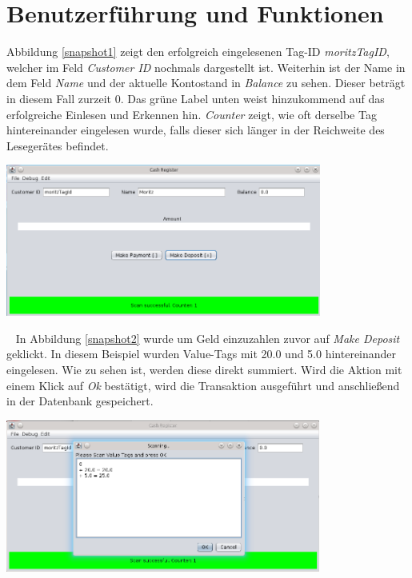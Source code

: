 \documentclass[11pt]{article} %
\begin{document}
\section{Benutzerführung und Funktionen}
Abbildung \ref{snapshot1} zeigt den erfolgreich eingelesenen Tag-ID
\textit{moritzTagID}, welcher im Feld \textit{Customer ID} nochmals
dargestellt ist. Weiterhin ist der Name in dem Feld \textit{Name} und der
aktuelle Kontostand in \textit{Balance} zu sehen. Dieser beträgt in diesem Fall
zurzeit 0. Das grüne Label unten weist hinzukommend auf das erfolgreiche
Einlesen und Erkennen hin. \textit{Counter} zeigt, wie oft derselbe Tag hintereinander
eingelesen wurde, falls dieser sich länger in der Reichweite des Lesegerätes
befindet.
\begin{center}
\includegraphics[height=5cm,keepaspectratio]{snapshot1.png}
\label{snapshot1}
\end{center}
~\newline
In Abbildung \ref{snapshot2} wurde um Geld einzuzahlen zuvor auf \textit{Make
Deposit} geklickt. In diesem Beispiel wurden Value-Tags mit 20.0 und 5.0
hintereinander eingelesen. Wie zu sehen ist, werden diese direkt summiert. Wird
die Aktion mit einem Klick auf \textit{Ok} bestätigt, wird die Transaktion
ausgeführt und anschließend in der Datenbank gespeichert.
\begin{center}
\includegraphics[height=5cm,keepaspectratio]{snapshot2.png}
\label{snapshot2}
\end{center}
\end{document}
